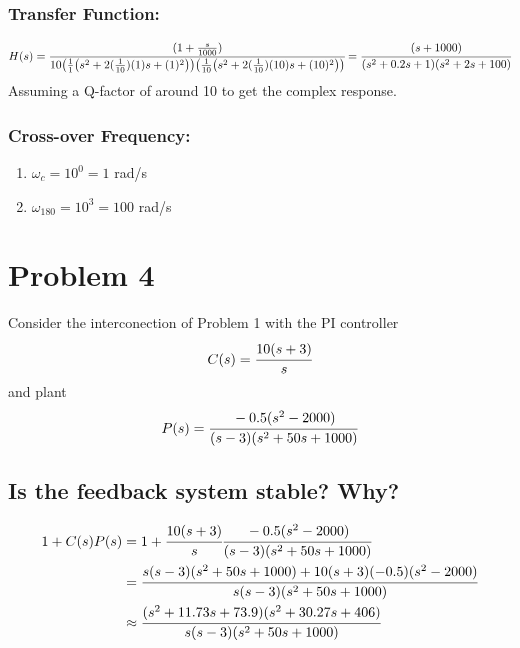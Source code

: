 \documentclass[letter]{article}
\numberwithin{equation}{section}
\begin{document}
\subsubsection{Transfer Function:}\[
	H(s) = \cfrac{
			(1 + \frac{s}{1000})
		}{
			10 \qty(
				\frac{1}{1}\qty(s^2 + 2(\frac{1}{10})(1)s + (1)^2)
			) \qty(
				\frac{1}{10}\qty(s^2 + 2(\frac{1}{10})(10)s + (10)^2)
			)
		} = \cfrac{
			(s+1000)
		}{
			\qty(s^2 + 0.2 s + 1) \qty(s^2 + 2s + 100)
		}
\]
Assuming a Q-factor of around 10 to get the complex response.


\subsubsection{Cross-over Frequency:}
\begin{enumerate}
	\item $\omega_c = 10^{0} = 1$ rad/s
	\item $\omega_{180} = 10^{3} = 100$ rad/s
\end{enumerate}



\newpage
\section{Problem 4}
Consider the interconection of Problem 1 with the PI controller\[
	C(s) = \cfrac{10 (s+3)}{s}
\] and plant \[
	P(s) = \cfrac{-0.5(s^2 - 2000)}{(s-3)(s^2 + 50s + 1000)}
\]

\subsection{Is the feedback system stable? Why?}
\begin{align*}
	1 + C(s) P(s) 
		&= 1 + \cfrac{10 (s+3)}{s} \cfrac{-0.5(s^2 - 2000)}{(s-3)(s^2 + 50s + 1000)}\\
		&= \cfrac{
			s (s-3) (s^2 + 50s + 1000) + 10 (s + 3) (-0.5) (s^2 - 2000)
		}{
			s (s-3) (s^2 + 50s + 1000)
		}\\
		&\approx \cfrac{
			(s^2 + 11.73s + 73.9) (s^2 + 30.27s + 406)
		}{
			s (s-3) (s^2 + 50s + 1000)
		}
\end{align*}










\end{document}

